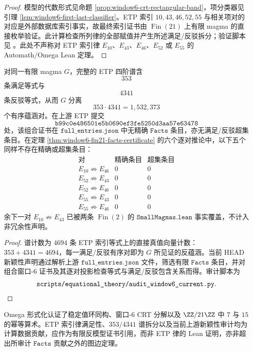 \documentclass[../../main.tex]{subfiles}
\begin{document}
\begin{proof}
模型的代数形式见命题 \ref{prop:window6-crt-rectangular-band}，项分类器见引理 \ref{lem:window6-first-last-classifier}。ETP 索引 \(10,43,46,52,55\) 与相关项对的对应是外部数据库索引事实，故最终索引证书由 \(\operatorname{Fin}(21)\) 上有限 magma 的直接枚举验证。此计算检查所列律的全部赋值并产生所述满足/反驳拆分；验证脚本见
\texttt{}。此处不声称对 ETP 索引律 \(E_{10}\)、\(E_{43}\)、\(E_{46}\)、\(E_{52}\) 或 \(E_{55}\) 的 Automath/Omega Lean 定理。
\end{proof}

\begin{corollary}\label{cor:window6-equational-spectrum}
对同一有限 magma \(G\)，完整的 ETP 四阶谱含
\[
    353
\]
条满足等式与
\[
    4341
\]
条反驳等式，从而 \(G\) 分离
\[
    353\cdot 4341=1{,}532{,}373
\]
个有序蕴涵对。在上游 ETP 提交
\[
    \texttt{b99c0e486501e5b0690ef3fe5250d3aa57e63478}
\]
处，该组合证书在 \(\texttt{full\_entries.json}\) 中无精确 \(\texttt{Facts}\) 条目，亦无满足/反驳超集条目。在定理 \ref{thm:window6-fin21-facts-certificate} 的六个逐对推论中，以下五个同样不存在精确或超集条目：
\[
\begin{array}{c|cc}
\text{对} & \text{精确条目} & \text{超集条目}\\
\hline
E_{10}\not\Rightarrow E_{46} & 0 & 0\\
E_{52}\not\Rightarrow E_{43} & 0 & 0\\
E_{52}\not\Rightarrow E_{46} & 0 & 0\\
E_{55}\not\Rightarrow E_{43} & 0 & 0\\
E_{55}\not\Rightarrow E_{46} & 0 & 0
\end{array}
\]
余下一对 \(E_{10}\not\Rightarrow E_{43}\) 已被两条 \(\operatorname{Fin}(2)\) 的 \(\texttt{SmallMagmas.lean}\) 事实覆盖，不计入非冗余性声明。
\end{corollary}

\begin{proof}
谱计数为 \(4694\) 条 ETP 索引等式上的直接真值向量计数：\(353+4341=4694\)，每一满足/反驳有序对即为 \(G\) 所见证的反蕴涵。当前 HEAD 新颖性声明通过解析上游 \(\texttt{full\_entries.json}\) 文件，筛选有限 \(\texttt{Facts}\) 条目，并对组合窗口-\(6\) 证书及其逐对投影检查等式与满足/反驳包含关系而得。审计脚本为
\[
    \texttt{\detokenize{scripts/equational_theory/audit_window6_current.py}}.
\]
\end{proof}

\begin{remark}[证书边界]\label{rem:window6-proof-boundary}
Omega 形式化认证了稳定值环同构、窗口-\(6\) CRT 分解以及 \(\ZZ/21\ZZ\) 中 \(7\) 与 \(15\) 的幂等算术。ETP 索引律满足性、\(353/4341\) 谱拆分以及当前上游新颖性审计均为计算数据贡献，应作为有限反模型证书引用，而非 ETP 律的 Lean 证明，亦非超出所审计 \(\texttt{Facts}\) 贡献之外的图边定理。
\end{remark}
\end{document}
